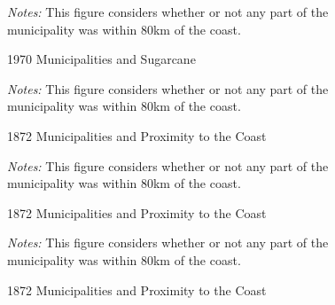 \documentclass{article}
\begin{document}
\begin{figure}
  \caption{1970 Municipalities and Sugarcane}
  \begin{center}
  \textit{Notes:} This figure considers whether or not any part of the municipality was within 80km of the coast.
  \end{center}
  \label{fig:sugarcane_1970}
\end{figure}

\begin{figure}
  \caption{1872 Municipalities and Proximity to the Coast}
  \begin{center}
  \textit{Notes:} This figure considers whether or not any part of the municipality was within 80km of the coast.
  \end{center}
  \label{fig:cotton_1970}
\end{figure}

\begin{figure}
  \caption{1872 Municipalities and Proximity to the Coast}
  \begin{center}
  \textit{Notes:} This figure considers whether or not any part of the municipality was within 80km of the coast.
  \end{center}
  \label{fig:sugarcane_1970}
\end{figure}

\begin{figure}
  \caption{1872 Municipalities and Proximity to the Coast}
  \begin{center}
  \textit{Notes:} This figure considers whether or not any part of the municipality was within 80km of the coast.
  \end{center}
  \label{fig:sugarcane_1970}
\end{figure}
\clearpage
\end{document}
